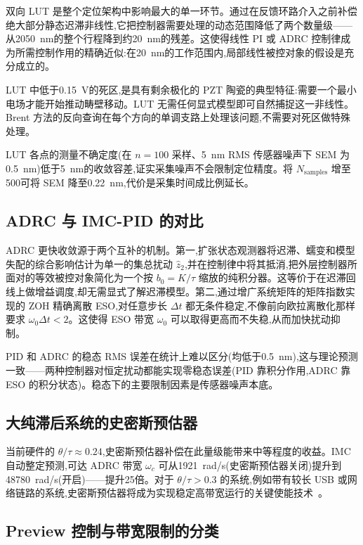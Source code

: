 \documentclass[fleqn,10pt]{wlscirep}
\begin{document}
双向 LUT 是整个定位架构中影响最大的单一环节。通过在反馈环路介入之前补偿绝大部分静态迟滞非线性,它把控制器需要处理的动态范围降低了两个数量级——从\SI{2050}{nm}的整个行程降到约\SI{20}{nm}的残差。这使得线性 PI 或 ADRC 控制律成为所需控制作用的精确近似:在\SI{20}{nm}的工作范围内,局部线性被控对象的假设是充分成立的。

LUT 中低于\SI{0.15}{V}的死区,是具有剩余极化的 PZT 陶瓷的典型特征:需要一个最小电场才能开始推动畴壁移动。LUT 无需任何显式模型即可自然捕捉这一非线性。Brent 方法的反向查询在每个方向的单调支路上处理该问题,不需要对死区做特殊处理。

LUT 各点的测量不确定度(在 $n = 100$ 采样、\SI{5}{nm} RMS 传感器噪声下 SEM 为\SI{0.5}{nm})低于\SI{5}{nm}的收敛容差,证实采集噪声不会限制定位精度。将 $N_{\text{samples}}$ 增至500可将 SEM 降至\SI{0.22}{nm},代价是采集时间成比例延长。

\subsection*{ADRC 与 IMC-PID 的对比}

ADRC 更快收敛源于两个互补的机制。第一,扩张状态观测器将迟滞、蠕变和模型失配的综合影响估计为单一的集总扰动 $\hat{z}_2$,并在控制律中将其抵消,把外层控制器所面对的等效被控对象简化为一个按 $b_0 = K/\tau$ 缩放的纯积分器。这等价于在迟滞回线上做增益调度,却无需显式了解迟滞模型。第二,通过增广系统矩阵的矩阵指数实现的 ZOH 精确离散 ESO,对任意步长 $\Delta t$ 都无条件稳定,不像前向欧拉离散化那样要求 $\omega_0 \Delta t < 2$。这使得 ESO 带宽 $\omega_0$ 可以取得更高而不失稳,从而加快扰动抑制。

PID 和 ADRC 的稳态 RMS 误差在统计上难以区分(均低于\SI{0.5}{nm}),这与理论预测一致——两种控制器对恒定扰动都能实现零稳态误差(PID 靠积分作用,ADRC 靠 ESO 的积分状态)。稳态下的主要限制因素是传感器噪声本底。

\subsection*{大纯滞后系统的史密斯预估器}

当前硬件的 $\theta/\tau \approx 0.24$,史密斯预估器补偿在此量级能带来中等程度的收益。IMC 自动整定预测,可达 ADRC 带宽 $\omega_c$ 可从\SI{1921}{rad/s}(史密斯预估器关闭)提升到\SI{48780}{rad/s}(开启)——提升25倍。对于 $\theta/\tau > 0.3$ 的系统,例如带有较长 USB 或网络链路的系统,史密斯预估器将成为实现稳定高带宽运行的关键使能技术~\cite{smith1957smith}。

\subsection*{Preview 控制与带宽限制的分类}
\end{document}
